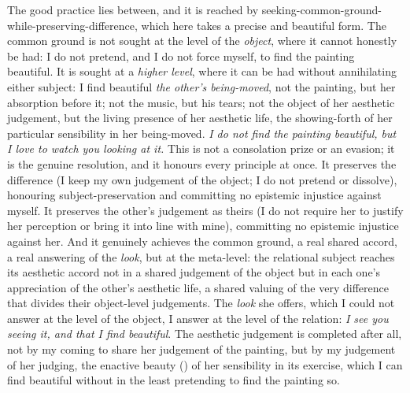 The good practice lies between, and it is reached by seeking-common-ground-while-preserving-difference, which here takes a precise and beautiful form. The common ground is not sought at the level of the \emph{object}, where it cannot honestly be had: I do not pretend, and I do not force myself, to find the painting beautiful. It is sought at a \emph{higher level}, where it can be had without annihilating either subject: I find beautiful \emph{the other's being-moved}, not the painting, but her absorption before it; not the music, but his tears; not the object of her aesthetic judgement, but the living presence of her aesthetic life, the showing-forth of her particular sensibility in her being-moved. \emph{I do not find the painting beautiful, but I love to watch you looking at it.} This is not a consolation prize or an evasion; it is the genuine resolution, and it honours every principle at once. It preserves the difference (I keep my own judgement of the object; I do not pretend or dissolve), honouring subject-preservation and committing no epistemic injustice against myself. It preserves the other's judgement as theirs (I do not require her to justify her perception or bring it into line with mine), committing no epistemic injustice against her. And it genuinely achieves the common ground, a real shared accord, a real answering of the \emph{look}, but at the meta-level: the relational subject reaches its aesthetic accord not in a shared judgement of the object but in each one's appreciation of the other's aesthetic life, a shared valuing of the very difference that divides their object-level judgements. The \emph{look} she offers, which I could not answer at the level of the object, I answer at the level of the relation: \emph{I see you seeing it, and that I find beautiful}. The aesthetic judgement is completed after all, not by my coming to share her judgement of the painting, but by my judgement of her judging, the enactive beauty () of her sensibility in its exercise, which I can find beautiful without in the least pretending to find the painting so.

